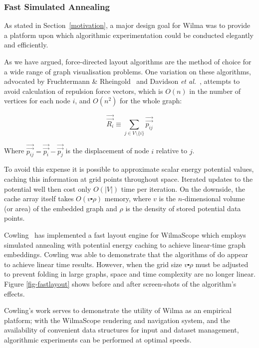 \documentclass[runningheads]{cl2emult}
\newcommand{\avec}[1]{\vec{\overrightarrow{ #1}}}
\begin{document}
\subsubsection{Fast Simulated Annealing}

As stated in Section~\ref{motivation}, a major design goal for Wilma
was to provide a platform upon which algorithmic experimentation could be
conducted elegantly and efficiently.

As we have argued, force-directed layout algorithms are the method of choice
for a wide range of graph visualisation problems.  One variation on these
	algorithms, advocated by Fruchtermann \&
	Rheingold~\cite{fruchtermann90force-directed} and Davidson {\em et
	al.}~\cite{davidson01noise}, attempts to avoid calculation of repulsion
	force vectors, which is $O(n)$ in the number of vertices for each node $i$,
	and $O(n^2)$ for the whole graph:

\begin{equation}
\label{repulsion}
\avec{R_i} \equiv \sum_{j \in V \setminus \{i\}} \avec{p_{ij}}
\end{equation}

\noindent Where $\avec{p_{ij}} = \avec{p_i} - \avec{p_j}$ is the displacement
of node $i$ relative to $j$.

To avoid this expense it is possible to approximate scalar energy potential
values, caching this information at grid points throughout space.  Iterated
updates to the potential well then cost only $O(|V|)$ time per iteration.  On
the downside, the cache array itself takes $O(v \centerdot \rho)$ memory,
where $v$ is the $n$-dimensional volume (or area) of the embedded graph and
$\rho$ is the density of stored potential data points.

Cowling~\cite{cowling02fast} has implemented a fast layout engine for
WilmaScope which employs simulated annealing with potential energy caching to
achieve linear-time graph embeddings.  Cowling was able to demonstrate that
the algorithms of \cite{davidson01noise} do appear to achieve linear time
results.  However, when the grid size $v \centerdot \rho$ must be adjusted to
prevent folding in large graphs, space and time complexity are no longer
linear.  Figure \ref{fig-fastlayout} shows before and after screen-shots of
the algorithm's effects.

Cowling's work serves to demonstrate the utility of Wilma as an empirical
platform; with the WilmaScope rendering and navigation system, and the
availability of convenient data structures for input and dataset management,
algorithmic experiments can be performed at optimal speeds.
\end{document}
